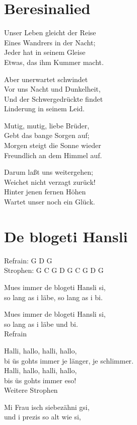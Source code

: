 \documentclass[
  letterpaper,
  twoside=false]{scrbook}
\begin{document}
\hypertarget{beresinalied}{%
\chapter{Beresinalied}\label{beresinalied}}

Unser Leben gleicht der Reise\\
Eines Wandrers in der Nacht;\\
Jeder hat in seinem Gleise\\
Etwas, das ihm Kummer macht.

Aber unerwartet schwindet\\
Vor uns Nacht und Dunkelheit,\\
Und der Schwergedrückte findet\\
Linderung in seinem Leid.

Mutig, mutig, liebe Brüder,\\
Gebt das bange Sorgen auf;\\
Morgen steigt die Sonne wieder\\
Freundlich an dem Himmel auf.

Darum laßt uns weitergehen;\\
Weichet nicht verzagt zurück!\\
Hinter jenen fernen Höhen\\
Wartet unser noch ein Glück.

\hypertarget{de-blogeti-hansli}{%
\chapter{De blogeti Hansli}\label{de-blogeti-hansli}}

Refrain: G D G\\
Strophen: G C G D G C G D G

Mues immer de blogeti Hansli si,\\
so lang as i läbe, so lang as i bi.

Mues immer de blogeti Hansli si,\\
so lang as i läbe und bi.\\
Refrain

Halli, hallo, halli, hallo,\\
bi üs gohts immer je länger, je schlimmer.\\
Halli, hallo, halli, hallo,\\
bis üs gohts immer eso!\\
Weitere Strophen

Mi Frau isch siebezähni gsi,\\
und i prezis so alt wie si,
\end{document}

